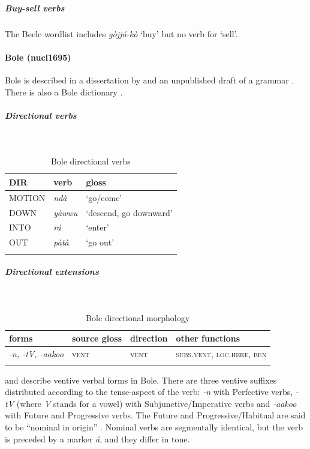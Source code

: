 \subparagraph{Buy-sell verbs}



The Beele wordlist includes \textit{gòjjú-kò} `buy' but no verb for `sell'. 
 
\paragraph*{Bole (nucl1695)} \label{bole} 

Bole is described in a dissertation by \citet{gimbaBoleVerbMorphology2000} and an unpublished draft of a grammar \citep{schuhBoleReferenceGrammar2005}. There is also a Bole dictionary \citep{gimbaBoleenglishhausaDictionaryAlhaji2004}.

\subparagraph{Directional verbs}~



\begin{table}[H]
	\caption{Bole directional verbs} 
	\label{tab:boleV}
	\begin{tabular}{lll} %
		\lsptoprule
		DIR & verb & gloss   \\ %
		\midrule
		MOTION & \textit{ndà} & `go/come' \\
		DOWN & \textit{yàwwu} & `descend, go downward' \\
		INTO& \textit{rá} & `enter' \\
		OUT & \textit{pàtà} & `go out' \\
		\lspbottomrule
	\end{tabular}
\end{table}

\subparagraph{Directional extensions}~



\begin{table}[H]
	\caption{Bole directional morphology}
	\label{tab:bole}
	\begin{tabular}{llll} %
		\lsptoprule
		forms & source gloss & direction  & other functions  \\ %
		\midrule
		\textit{-n, -tV, -aakoo}  &  \textsc{vent}  &   \textsc{vent} &  \textsc{subs.vent}, \textsc{loc.here}, \textsc{ben}  \\
		\lspbottomrule
	\end{tabular}
\end{table} 

\citet{gimbaBoleVerbMorphology2000} and \citet{schuhBoleReferenceGrammar2005} describe ventive verbal forms in Bole. There are three ventive suffixes distributed according to the tense-aspect of the verb: \textit{-n} with Perfective verbs, \textit{-tV} (where \textit{V} stands for a vowel) with Subjunctive{\slash}Imperative verbs and \textit{-aakoo} with Future and Progressive verbs. The Future and Progressive/Habitual are said to be ``nominal in origin'' \citep[307]{schuhChadicCornucopia2017}. Nominal verbs are segmentally identical, but the verb is preceded by a marker \textit{á}, and they differ in tone.

